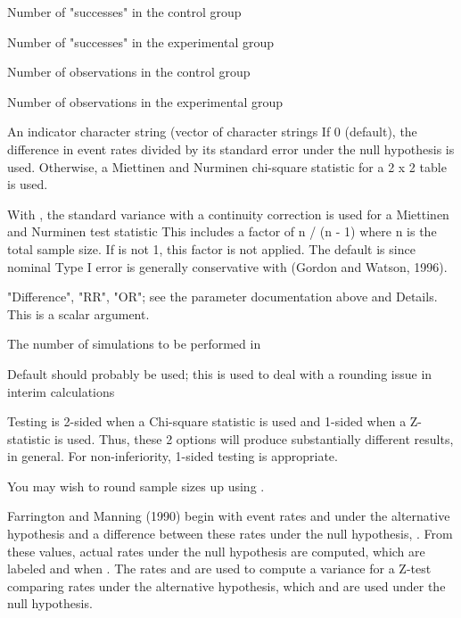 \begin{Arguments}
\begin{ldescription}
\item[\code{x1}] Number of "successes" in the control group
\item[\code{x2}] Number of "successes" in the experimental group
\item[\code{n1}] Number of observations in the control group
\item[\code{n2}] Number of observations in the experimental group
\item[\code{chisq}] An indicator character string (vector of character strings
If 0 (default), the difference in event rates divided by its standard error under the null hypothesis is used. 
Otherwise, a Miettinen and Nurminen chi-square statistic for a 2 x 2 table is used.
\item[\code{adj}] With , the standard variance with a continuity correction is used for a Miettinen and Nurminen test statistic 
This includes a factor of n / (n - 1) where n is the total sample size. If  is not 1, 
this factor is not applied. The default is  since nominal Type I error is generally conservative with 
(Gordon and Watson, 1996).
\item[\code{scale}] "Difference", "RR", "OR"; see the  parameter documentation above and Details. 
This is a scalar argument.
\item[\code{nsim}] The number of simulations to be performed in 
\item[\code{tol}] Default should probably be used; this is used to deal with a rounding issue in interim calculations
\end{ldescription}
\end{Arguments}
\begin{Details}\relax
Testing is 2-sided when a Chi-square statistic is used and 1-sided when a Z-statistic is used.
Thus, these 2 options will produce substantially different results, in general.
For non-inferiority, 1-sided testing is appropriate.

You may wish to round sample sizes up using .

Farrington and Manning (1990) begin with event rates  and  under the alternative hypothesis
and a difference between these rates under the null hypothesis, .
From these values, actual rates under the null hypothesis are computed, which are labeled  and 
when .
The rates  and  are used to compute a variance for a Z-test comparing rates under the alternative hypothesis,
which  and  are used under the null hypothesis.
\end{Details}
